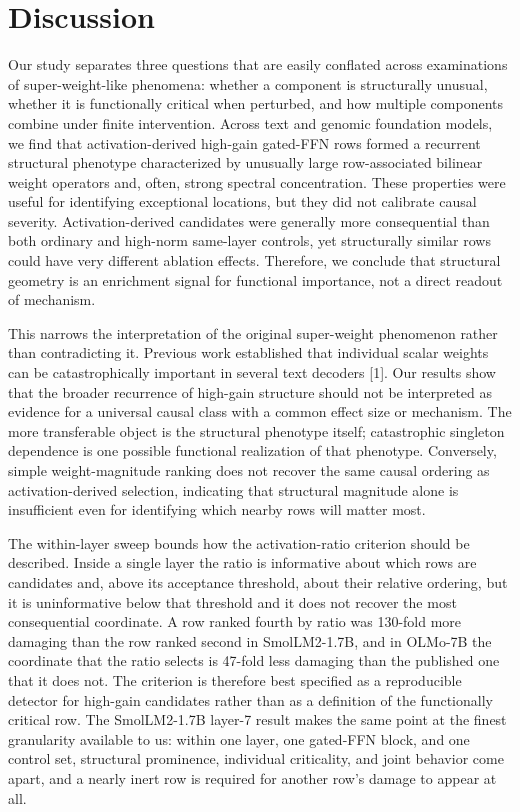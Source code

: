 \documentclass[11pt]{article}
\begin{document}
\section*{Discussion}
Our study separates three questions that are easily conflated across examinations of super-weight-like phenomena: whether a component is structurally unusual, whether it is functionally critical when perturbed, and how multiple components combine under finite intervention. Across text and genomic foundation models,  we find that activation-derived high-gain gated-FFN rows formed a recurrent structural phenotype characterized by unusually large row-associated bilinear weight operators and, often, strong spectral concentration. These properties were useful for identifying exceptional locations, but they did not calibrate causal severity. Activation-derived candidates were generally more consequential than both ordinary and high-norm same-layer controls, yet structurally similar rows could have very different ablation effects. Therefore, we conclude that structural geometry is an enrichment signal for functional importance, not a direct readout of mechanism.

This narrows the interpretation of the original super-weight phenomenon rather than contradicting it. Previous work established that individual scalar weights can be catastrophically important in several text decoders [1]. Our results show that the broader recurrence of high-gain structure should not be interpreted as evidence for a universal causal class with a common effect size or mechanism. The more transferable object is the structural phenotype itself; catastrophic singleton dependence is one possible functional realization of that phenotype. Conversely, simple weight-magnitude ranking does not recover the same causal ordering as activation-derived selection, indicating that structural magnitude alone is insufficient even for identifying which nearby rows will matter most.

The within-layer sweep bounds how the activation-ratio criterion should be described. Inside a single layer the ratio is informative about which rows are candidates and, above its acceptance threshold, about their relative ordering, but it is uninformative below that threshold and it does not recover the most consequential coordinate. A row ranked fourth by ratio was 130-fold more damaging than the row ranked second in SmolLM2-1.7B, and in OLMo-7B the coordinate that the ratio selects is 47-fold less damaging than the published one that it does not. The criterion is therefore best specified as a reproducible detector for high-gain candidates rather than as a definition of the functionally critical row. The SmolLM2-1.7B layer-7 result makes the same point at the finest granularity available to us: within one layer, one gated-FFN block, and one control set, structural prominence, individual criticality, and joint behavior come apart, and a nearly inert row is required for another row’s damage to appear at all.
\end{document}
